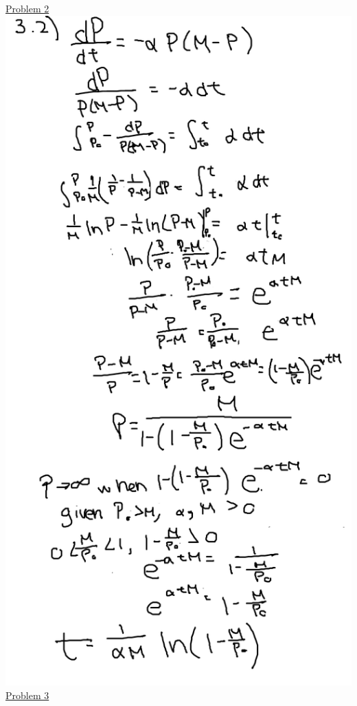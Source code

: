 \documentclass{article}
\begin{document}
\underline{Problem 2}\newline{}
\includegraphics[width=\textwidth,height=\textheight,keepaspectratio]{3-2.png}\clearpage{}
\underline{Problem 3}\newline{}
\end{document}
